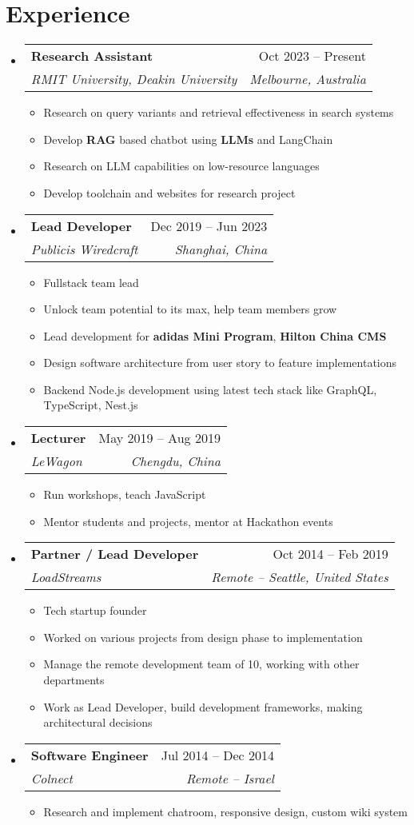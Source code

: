 \documentclass[a4paper,11pt]{article}
\makeatletter
\newcommand{\resumeItem}[1]{
  \item\small{#1}
}
\newcommand{\resumeItemListStart}{\begin{itemize}[rightmargin=0.11in]}
\newcommand{\resumeItemListEnd}{\end{itemize}}
\newcommand{\resumeQuadHeading}[4]{
  \item
  \begin{tabular*}{0.96\textwidth}[t]{l@{\extracolsep{\fill}}r}
    \textbf{#1} & #2 \\
    \textit{\small#3} & \textit{\small #4} \\
  \end{tabular*}
}
\newcommand{\resumeHeadingListStart}{
  \begin{itemize}[leftmargin=0.15in, label={}]
}
\newcommand{\resumeHeadingListEnd}{\end{itemize}}
\makeatother
\begin{document}
\section{Experience}
\resumeHeadingListStart{}
  \resumeQuadHeading{Research Assistant}{Oct 2023 -- Present}
  {RMIT University, Deakin University}{Melbourne, Australia}
    \resumeItemListStart{}
      \resumeItem{Research on query variants and retrieval effectiveness in search systems}
      \resumeItem{Develop \textbf{RAG} based chatbot using \textbf{LLMs} and LangChain}
      \resumeItem{Research on LLM capabilities on low-resource languages}
      \resumeItem{Develop toolchain and websites for research project}
    \resumeItemListEnd{}

  \resumeQuadHeading{Lead Developer}{Dec 2019 -- Jun 2023}
  {Publicis Wiredcraft}{Shanghai, China}
    \resumeItemListStart{}
      \resumeItem{Fullstack team lead}
      \resumeItem{Unlock team potential to its max, help team members grow}
      \resumeItem{Lead development for \textbf{adidas Mini Program}, \textbf{Hilton China CMS}}
      \resumeItem{Design software architecture from user story to feature implementations}
      \resumeItem{Backend Node.js development using latest tech stack like GraphQL, TypeScript, Nest.js}
    \resumeItemListEnd{}

  \resumeQuadHeading{Lecturer}{May 2019 -- Aug 2019}
  {LeWagon}{Chengdu, China}
    \resumeItemListStart{}
      \resumeItem{Run workshops, teach JavaScript}
      \resumeItem{Mentor students and projects, mentor at Hackathon events}
    \resumeItemListEnd{}

  \resumeQuadHeading{Partner / Lead Developer}{Oct 2014 -- Feb 2019}
  {LoadStreams}{Remote -- Seattle, United States}
    \resumeItemListStart{}
      \resumeItem{Tech startup founder}
      \resumeItem{Worked on various projects from design phase to implementation}
      \resumeItem{Manage the remote development team of 10, working with other departments}
      \resumeItem{Work as Lead Developer, build development frameworks, making architectural decisions}
    \resumeItemListEnd{}

  \resumeQuadHeading{Software Engineer}{Jul 2014 -- Dec 2014}
  {Colnect}{Remote -- Israel}
    \resumeItemListStart{}
      \resumeItem{Research and implement chatroom, responsive design, custom wiki system}
    \resumeItemListEnd{}
\resumeHeadingListEnd{}


\end{document}

